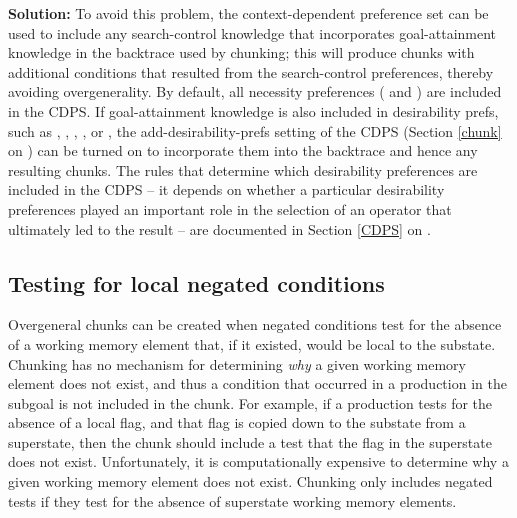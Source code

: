 \textbf{Solution:} To avoid this problem, the context-dependent preference set
can be used to include any search-control knowledge that incorporates
goal-attainment knowledge in the backtrace used by chunking;  this will produce
chunks with additional conditions that resulted from the search-control
preferences, thereby avoiding overgenerality.  By default, all necessity
preferences ( and ) are included in the CDPS.  If
goal-attainment knowledge is also included in desirability prefs, such as
, , , , or ,
the add-desirability-prefs setting of the CDPS (Section \ref{chunk} on \pageref{chunk}) 
can be turned on to incorporate them into the backtrace and hence
any resulting chunks.   The rules that determine which desirability preferences
are included in the CDPS -- it depends on whether a particular desirability
preferences played an important role in the selection of an
operator that ultimately led to the result -- are documented in Section \ref{CDPS} on \pageref{CDPS}.

\subsection{Testing for local negated conditions}


Overgeneral chunks can be created when negated conditions test for the absence
of a working memory element that, if it existed, would be local to the
substate.  Chunking has no mechanism for determining \textit{why} a given
working memory element does not exist, and thus a condition that occurred in a
production in the subgoal is not included in the chunk. For example, if a
production tests for the absence of a local flag, and that flag is copied down
to the substate from a superstate, then the chunk should include a test that
the flag in the superstate does not exist. 
Unfortunately, it is computationally expensive to determine why a given
working memory element does not exist. Chunking only includes negated tests if
they test for the absence of superstate working memory elements. 

